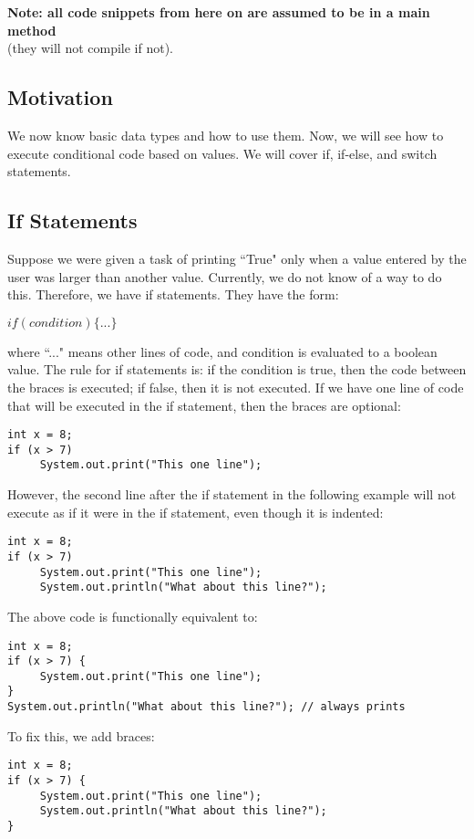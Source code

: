
\begin{center}
\textbf{Note: all code snippets from here on are assumed to be in a main method} \\ (they will not compile if not).
\end{center}

\subsection{Motivation}
We now know basic data types and how to use them. Now, we will see how to execute conditional code based on values. We will cover if, if-else, and switch statements.

\subsection{If Statements}
Suppose we were given a task of printing ``True" only when a value entered by the user was larger than another value. Currently, we do not know of a way to do this. Therefore, we have if statements. They have the form:
\begin{center}
$if(condition) \{ ... \}$
\end{center}
where ``..." means other lines of code, and condition is evaluated to a boolean value. The rule for if statements is: if the condition is true, then the code between the braces is executed; if false, then it is not executed. If we have one line of code that will be executed in the if statement, then the braces are optional:
\begin{lstlisting}
int x = 8;
if (x > 7)
     System.out.print("This one line");
\end{lstlisting}
However, the second line after the if statement in the following example will not execute as if it were in the if statement, even though it is indented:
\begin{lstlisting}
int x = 8;
if (x > 7)
     System.out.print("This one line");
     System.out.println("What about this line?");
\end{lstlisting}
The above code is functionally equivalent to:
\begin{lstlisting}
int x = 8;
if (x > 7) {
     System.out.print("This one line");
}
System.out.println("What about this line?"); // always prints
\end{lstlisting}
To fix this, we add braces:
\begin{lstlisting}
int x = 8;
if (x > 7) {
     System.out.print("This one line");
     System.out.println("What about this line?");
}
\end{lstlisting}
